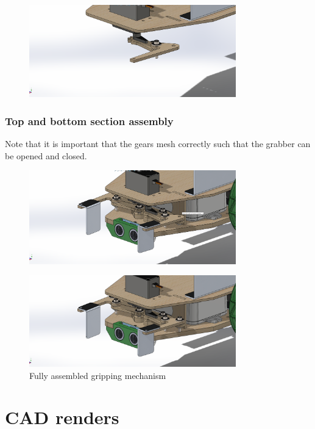 \documentclass{article}
\begin{document}
\begin{figure}[H]
    \centering
    \includegraphics[width=0.8\textwidth]{assets/assembly/7.png}
\end{figure}

\subsubsection{Top and bottom section assembly}
\quad Note that it is important that the gears mesh correctly such that the grabber can be opened and closed. 

\begin{figure}[H]
    \centering
    \includegraphics[width=0.8\textwidth]{assets/assembly/8.png}
\end{figure}

\begin{figure}[H]
    \centering
    \includegraphics[width=0.8\textwidth]{assets/assembly/9.png}
    \caption{Fully assembled gripping mechanism}
\end{figure}

\section{CAD renders}
\end{document}

